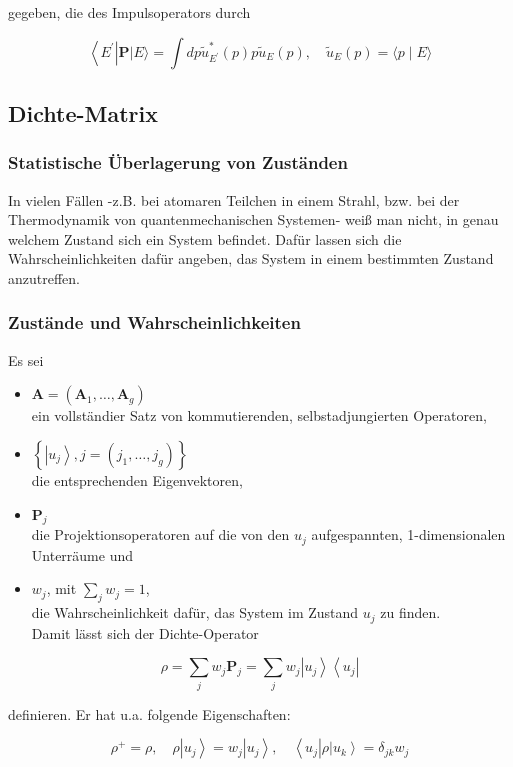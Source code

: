 \documentclass[10pt, letterpaper]{article}
\begin{document}
gegeben, die des Impulsoperators durch

$$
\left\langle E^{\prime}\right| \mathbf{P}|E\rangle=\int d p \tilde{u}_{E^{\prime}}^{*}(p) p \tilde{u}_{E}(p), \quad \tilde{u}_{E}(p)=\langle p \mid E\rangle
$$

\subsection*{Dichte-Matrix}
\subsubsection*{Statistische Überlagerung von Zuständen}
In vielen Fällen -z.B. bei atomaren Teilchen in einem Strahl, bzw. bei der Thermodynamik von quantenmechanischen Systemen- weiß man nicht, in genau welchem Zustand sich ein System befindet. Dafür lassen sich die Wahrscheinlichkeiten dafür angeben, das System in einem bestimmten Zustand anzutreffen.

\subsubsection*{Zustände und Wahrscheinlichkeiten}
Es sei

\begin{itemize}
  \item $\mathbf{A}=\left(\mathbf{A}_{1}, \ldots, \mathbf{A}_{g}\right)$\\
ein vollständier Satz von kommutierenden, selbstadjungierten Operatoren,
  \item $\left\{\left|u_{j}\right\rangle, j=\left(j_{1}, \ldots, j_{g}\right)\right\}$\\
die entsprechenden Eigenvektoren,
  \item $\mathbf{P}_{j}$\\
die Projektionsoperatoren auf die von den $u_{j}$ aufgespannten, 1-dimensionalen Unterräume und
  \item $w_{j}$, mit $\sum_{j} w_{j}=1$,\\
die Wahrscheinlichkeit dafür, das System im Zustand $u_{j}$ zu finden.\\
Damit lässt sich der Dichte-Operator
\end{itemize}

$$
\rho=\sum_{j} w_{j} \mathbf{P}_{j}=\sum_{j} w_{j}\left|u_{j}\right\rangle\left\langle u_{j}\right|
$$

definieren. Er hat u.a. folgende Eigenschaften:

$$
\rho^{+}=\rho, \quad \rho\left|u_{j}\right\rangle=w_{j}\left|u_{j}\right\rangle, \quad\left\langle u_{j}\right| \rho\left|u_{k}\right\rangle=\delta_{j k} w_{j}
$$
\end{document}
